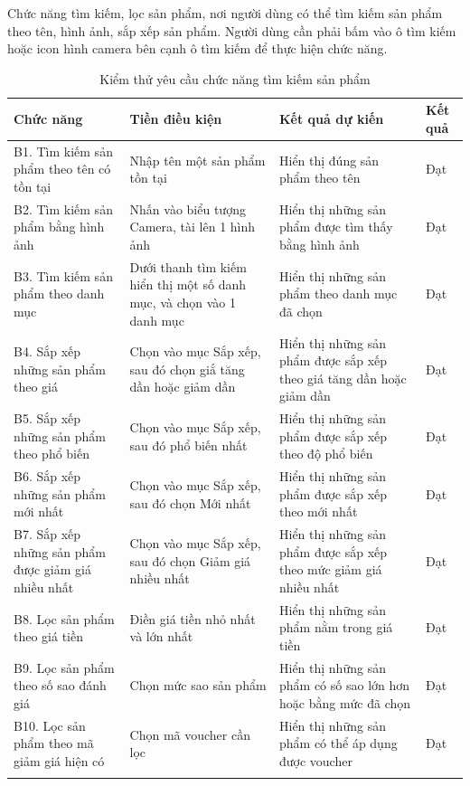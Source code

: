 \noindent Chức năng tìm kiếm, lọc sản phẩm, nơi người dùng có thể tìm kiếm sản phẩm theo tên, hình ảnh, sắp xếp sản phẩm. Người dùng cần phải bấm vào ô tìm kiếm hoặc icon hình camera bên cạnh ô tìm kiếm để thực hiện chức năng.

\begin{longtable}{|p{4cm}|p{4cm}|p{4cm}|p{2cm}|}
    \hline
    Chức năng & Tiền điều kiện & Kết quả dự kiến & Kết quả \\
    \hline
    B1. Tìm kiếm sản phẩm theo tên có tồn tại & Nhập tên một sản phẩm tồn tại  & Hiển thị đúng sản phẩm theo tên & Đạt\\
    \hline
    B2. Tìm kiếm sản phẩm bằng hình ảnh & Nhấn vào biểu tượng Camera, tài lên 1 hình ảnh & Hiển thị những sản phẩm được tìm thấy bằng hình ảnh & Đạt\\
    \hline
    B3. Tìm kiếm sản phẩm theo danh mục & Dưới thanh tìm kiếm hiển thị một số danh mục, và chọn vào 1 danh mục & Hiển thị những sản phẩm theo danh mục đã chọn & Đạt\\
    \hline
    B4. Sắp xếp những sản phẩm theo giá & Chọn vào mục Sắp xếp, sau đó chọn giắ tăng dần hoặc giảm dần & Hiển thị những sản phẩm được sắp xếp theo giá tăng dần hoặc giảm dần & Đạt\\
    \hline
    B5. Sắp xếp những sản phẩm theo phổ biến & Chọn vào mục Sắp xếp, sau đó phổ biến nhất & Hiển thị những sản phẩm được sắp xếp theo độ phổ biến & Đạt\\
    \hline
    B6. Sắp xếp những sản phẩm mới nhất & Chọn vào mục Sắp xếp, sau đó chọn Mới nhất & Hiển thị những sản phẩm được sắp xếp theo mới nhất & Đạt\\
    \hline
     B7. Sắp xếp những sản phẩm được giảm giá nhiều nhất & Chọn vào mục Sắp xếp, sau đó chọn Giảm giá nhiều nhất & Hiển thị những sản phẩm được sắp xếp theo mức giảm giá nhiều nhất & Đạt\\
    \hline
    B8. Lọc sản phẩm theo giá tiền & Điền giá tiền nhỏ nhất và lớn nhất & Hiển thị những sản phẩm nằm trong giá tiền & Đạt\\
    \hline
    B9. Lọc sản phẩm theo số sao đánh giá & Chọn mức sao sản phẩm & Hiển thị những sản phẩm có số sao lớn hơn hoặc bằng mức đã chọn & Đạt\\
    \hline
    B10. Lọc sản phẩm theo mã giảm giá hiện có & Chọn mã voucher cần lọc & Hiển thị những sản phẩm có thể áp dụng được voucher & Đạt\\
    \hline
    \caption{Kiểm thử yêu cầu chức năng tìm kiếm sản phẩm}
\end{longtable}

